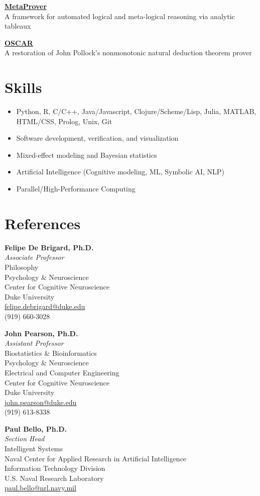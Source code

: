 \documentclass[margin]{res}
\begin{document}
\begin{resume}
  \href{https://github.com/kevingoneill/MetaProver}{\textbf{MetaProver}}
  \\ A framework for automated logical and meta-logical reasoning via
  analytic tableaux

  \href{http://rair.cogsci.rpi.edu/projects/automated-reasoners/oscar/}{\textbf{OSCAR}} \\
  A restoration of John Pollock's nonmonotonic natural deduction theorem prover \\

  \section{Skills}
  \begin{itemize}
  \item Python, R, C/C++, Java/Javascript, Clojure/Scheme/Lisp, Julia, MATLAB, HTML/CSS, Prolog, Unix, Git
  \item Software development, verification, and visualization
  \item Mixed-effect modeling and Bayesian statistics
  \item Artificial Intelligence (Cognitive modeling, ML, Symbolic AI, NLP)
  \item Parallel/High-Performance Computing
  \end{itemize}

  \section{References}
  \textbf{Felipe De Brigard, Ph.D.}\\
  \emph{Associate Professor}\\
  Philosophy\\
  Psychology \& Neuroscience\\
  Center for Cognitive Neuroscience\\
  Duke University\\
  \href{mailto:felipe.debrigard@duke.edu}{felipe.debrigard@duke.edu} \\
  (919) 660-3028
  
  \textbf{John Pearson, Ph.D.}\\
  \emph{Assistant Professor}\\
  Biostatistics \& Bioinformatics\\
  Psychology \& Neuroscience\\
  Electrical and Computer Engineering\\
  Center for Cognitive Neuroscience\\
  Duke University\\
  \href{mailto:john.pearson@duke.edu}{john.pearson@duke.edu}\\
  (919) 613-8338

  \textbf{Paul Bello, Ph.D.}\\
  \emph{Section Head}\\
  Intelligent Systems\\
  Naval Center for Applied Research in Artificial Intelligence\\
  Information Technology Division\\
  U.S. Naval Research Laboratory\\
  \href{mailto:paul.bello@nrl.navy.mil}{paul.bello@nrl.navy.mil} 
  
\end{resume}
\end{document}
